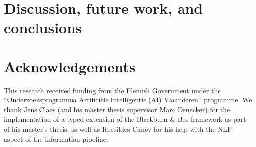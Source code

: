 \documentclass[3p]{elsarticle}
\newcommand\comment[1]{\marginpar{\tiny #1}}
\renewcommand\comment[1]{#1}
\newcommand{\bart}[1]{{\comment{\color{red}\textsc{BB:}#1}}}
\newcommand{\tias}[1]{{\comment{\color{blue}\textsc{TG:}#1}}}
\newcommand{\emilio}[1]{{\comment{\color{red}\textsc{EG:}#1}}}
\newcommand{\todo}[1]{{\comment{\color{red}\textsc{TODO:}#1}}}
\begin{document}
\section{Discussion, future work, and conclusions}\label{sec:conclusion}










\section*{Acknowledgements}
This research received funding from the Flemish Government under the ``Onderzoeksprogramma Artifici\"ele Intelligentie (AI) Vlaanderen'' programme. 
We thank Jens Claes (and his master thesis supervisor Marc Denecker) for the implementation of a typed extension of the Blackburn \& Bos framework as part of his master's thesis, as well as Rocsildes Canoy for his help with the NLP aspect of the information pipeline. %



\end{document}
